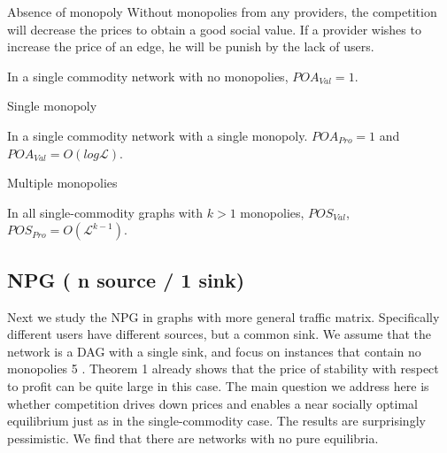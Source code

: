 \documentclass{beamer}
\begin{document}
\begin{frame}{Absence of monopoly}
  Without monopolies from any providers, the competition will decrease the prices to obtain a good social value. If a provider wishes to increase the price of an edge, he will be punish by the lack of users.
  \begin{theorem}
    In a single commodity network with no monopolies, \(POA_{Val} = 1\).%
  \end{theorem}
\end{frame}

\begin{frame}{Single monopoly}
  \begin{theorem}
    In a single commodity network with a single monopoly. \(POA_{Pro} = 1\) and \(POA_{Val} = O(log \mathcal{L})\).
  \end{theorem}
\end{frame}

\begin{frame}{Multiple monopolies}
  \begin{theorem}
    In all single-commodity graphs with \(k > 1\) monopolies, \(POS_{Val}\), \(POS_{Pro} = O(\mathcal{L}^{k-1})\).%
  \end{theorem}
\end{frame}


\subsection{NPG ( n source / 1 sink)}


\begin{frame}
Next we study the NPG in graphs with more general traffic matrix. Specifically
different users have different sources, but a common sink. We assume that the
network is a DAG with a single sink, and focus on instances that contain no
monopolies 5 . Theorem 1 already shows that the price of stability with respect
to profit can be quite large in this case. The main question we address here
is whether competition drives down prices and enables a near socially optimal
equilibrium just as in the single-commodity case.
The results are surprisingly pessimistic. We find that there are networks with
no pure equilibria.
\end{frame}
\end{document}
